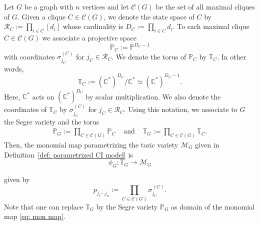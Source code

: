 \documentclass[11pt]{amsart}
\numberwithin{equation}{section}
\theoremstyle{plain}
\numberwithin{theorem}{section}
\theoremstyle{definition}
\newcommand{\PP}{{\mathbb P}}
\begin{document}
Let $G$ be a graph with $n$ vertices and let $\mathcal{C}(G)$ be the set of all maximal cliques of $G$. Given a clique $C\in\mathcal{C}(G)$, we denote the state space of $C$ by $\mathcal{R}_C:=\prod_{i\in C}[d_i]$ whose cardinality is $D_C:=\prod_{i\in C}d_i$. To each maximal clique $C\in \mathcal{C}(G)$ we associate a projective space 
\[
\mathbb{P}_C:=\mathbb{P}^{D_C-1}
\]
with coordinates $\sigma^{(C)}_{j_C}$ for $j_C\in \mathcal{R}_C$. We denote the torus of $\mathbb{P}_C$ by $\mathbb{T}_C$. In other words, 
\[
\mathbb{T}_C:=(\mathbb{C}^{*})^{D_C}/\mathbb{C}^{*}\simeq (\mathbb{C}^{*})^{D_C-1}.
\]
Here, $\mathbb{C}^{*}$ acts on $(\mathbb{C}^{*})^{D_C}$ by scalar multiplication.
We also denote the coordinates of $\mathbb{T}_C$ by $\sigma^{(C)}_{j_C}$ for  $j_C\in\mathcal{R}_C$.
Using this notation, we associate to $G$ the Segre variety and the torus 
\[ \begin{array}{ccc}
\mathbb{P}_G:= \displaystyle\prod_{C\in\mathcal{C}(G)} \mathbb{P}_C & \text{ and }& \displaystyle
\mathbb{T}_G:=\prod_{C\in\mathcal{C}(G)}\mathbb{T}_C.
\end{array}
\]
Then, the monomial map parametrizing the toric variety $\mathcal{M}_G$ given in Definition~\ref{def: parametrized CI model}  is 
\begin{equation}
    \label{eq: mon map}
    \phi_G:\mathbb{T}_G\longrightarrow\mathcal{M}_G
\end{equation}

given by 
\begin{equation}\label{eq:mon map}
p_{j_1\cdots j_n}:=\prod_{C\in\mathcal{C}(G)}\sigma^{(C)}_{j_C}.
\end{equation}
Note that one can replace $\mathbb{T}_G$ by the Segre variety $\PP_G$ as domain of the monomial map \eqref{eq: mon map}.
 
\end{document}
